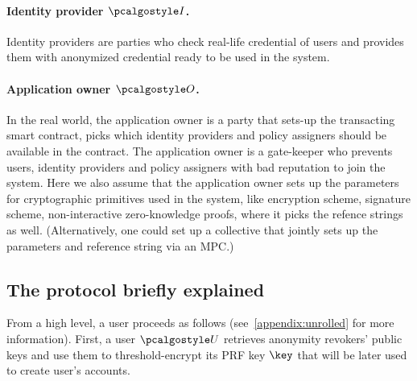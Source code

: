 \documentclass[runningheads,10pt]{llncs}
\numberwithin{equation}{section}
\begin{document}
\paragraph{Identity provider $\idprov$.}
Identity providers are parties who check real-life credential of users and
provides them with anonymized credential ready to be used in the system.

\paragraph{Application owner $\owner$.}
In the real world, the application owner is a party
that sets-up the transacting smart contract, picks which identity providers and
policy assigners should be available in the contract. The application owner is a
gate-keeper who prevents users, identity providers and policy assigners with bad
reputation to join the system. Here we also assume that the application owner
sets up the parameters for cryptographic primitives used in the system, like
encryption scheme, signature scheme, non-interactive zero-knowledge proofs,
where it picks the refence strings as well. (Alternatively, one could set up a
collective that jointly sets up the parameters and reference string via an MPC.)

\subsection{The protocol briefly explained}
From a high level, a user proceeds as follows (see~\ref{appendix:unrolled}
for more information). First, a user $\user$ retrieves
anonymity revokers' public keys and use them to threshold-encrypt its PRF key $\key$
that will be later used to create user's accounts.
\end{document}
